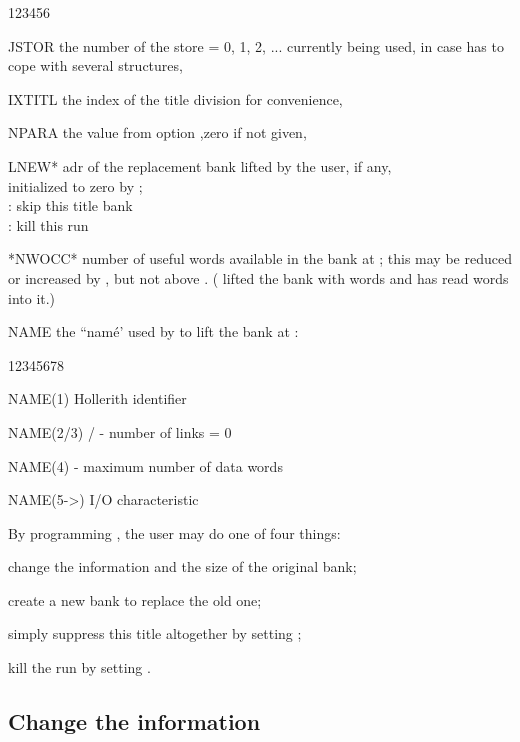 \begin{DLtt}{123456}
\item[JSTOR] the number of the store = 0, 1, 2, ... currently being
             used, in case  has to cope with several structures,
\item[IXTITL]  the index of the title division for convenience,
\item[NPARA] the value  from option ,zero  if  not given,
\item[LNEW*]  adr of the replacement bank lifted by the user, if any,\\
              initialized to zero by ;\\
              :  skip this title bank\\
              :  kill this run
\item[*NWOCC*] number of useful words available in the bank at ;
              this may be reduced or increased by , but not
              above .  ( lifted the bank with
               words and has read  words into it.)
\item[NAME]  the ``nam\'e' used by  to lift the bank at :
         \begin{DLtt}{12345678}
            \item[NAME(1)]    Hollerith identifier
            \item[NAME(2/3)]   /  - number of links = 0
            \item[NAME(4)]     - maximum number of data words
            \item[NAME(5->)]  I/O characteristic
         \end{DLtt}
\end{DLtt}

By programming , the user may do one of four things:
\begin{OL}
\item change the information and the size of the original bank;
\item create a new bank to replace the old one;
\item simply suppress this title altogether by setting ;
\item kill the run by setting .
\end{OL}

\subsection*{Change the information}

